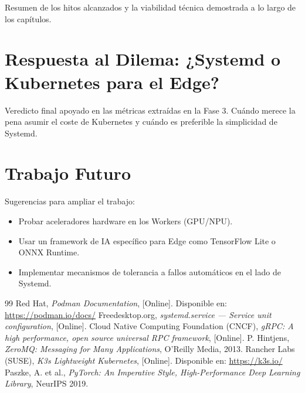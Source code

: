 \documentclass[11pt, a4paper]{report}
\begin{document}
Resumen de los hitos alcanzados y la viabilidad técnica demostrada a lo largo de los capítulos.

\section{Respuesta al Dilema: ¿Systemd o Kubernetes para el Edge?}
Veredicto final apoyado en las métricas extraídas en la Fase 3. Cuándo merece la pena asumir el coste de Kubernetes y cuándo es preferible la simplicidad de Systemd.

\section{Trabajo Futuro}
Sugerencias para ampliar el trabajo: 
\begin{itemize}
    \item Probar aceleradores hardware en los Workers (GPU/NPU).
    \item Usar un framework de IA específico para Edge como TensorFlow Lite o ONNX Runtime.
    \item Implementar mecanismos de tolerancia a fallos automáticos en el lado de Systemd.
\end{itemize}

\vspace{1cm}

\begin{thebibliography}{99}
 Red Hat, \textit{Podman Documentation}, [Online]. Disponible en: \url{https://podman.io/docs/}
 Freedesktop.org, \textit{systemd.service — Service unit configuration}, [Online].
 Cloud Native Computing Foundation (CNCF), \textit{gRPC: A high performance, open source universal RPC framework}, [Online].
 P. Hintjens, \textit{ZeroMQ: Messaging for Many Applications}, O'Reilly Media, 2013.
 Rancher Labs (SUSE), \textit{K3s Lightweight Kubernetes}, [Online]. Disponible en: \url{https://k3s.io/}
 Paszke, A. et al., \textit{PyTorch: An Imperative Style, High-Performance Deep Learning Library}, NeurIPS 2019.
\end{thebibliography}
\end{document}
